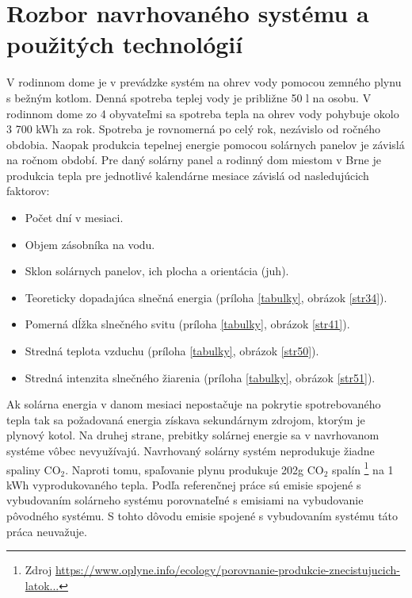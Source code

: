 \documentclass[a4paper, 11pt]{article}
\begin{document}
\section{Rozbor navrhovaného systému a použitých technológií}

V rodinnom dome je v prevádzke systém na ohrev vody pomocou zemného plynu s bežným kotlom. Denná spotreba teplej vody je približne 50 l na osobu. V rodinnom dome zo 4 obyvateľmi sa spotreba tepla na ohrev vody pohybuje okolo 3 700 kWh za rok. Spotreba je rovnomerná po celý rok, nezávislo od ročného obdobia. Naopak produkcia tepelnej energie pomocou solárnych panelov je závislá na ročnom období. Pre daný solárny panel a rodinný dom miestom v Brne je produkcia tepla pre jednotlivé kalendárne mesiace závislá od nasledujúcich faktorov:
\begin{itemize}
	\item Počet dní v mesiaci.
	\item Objem zásobníka na vodu.
	\item Sklon solárnych panelov, ich plocha a orientácia (juh).
	\item Teoreticky dopadajúca slnečná energia (príloha \ref{tabulky}, obrázok \ref{str34}).
	\item Pomerná dĺžka slnečného svitu (príloha \ref{tabulky}, obrázok \ref{str41}).
	\item Stredná teplota vzduchu (príloha \ref{tabulky}, obrázok \ref{str50}).
	\item Stredná intenzita slnečného žiarenia (príloha \ref{tabulky}, obrázok \ref{str51}).
\end{itemize}

Ak solárna energia v danom mesiaci nepostačuje na pokrytie spotrebovaného tepla tak sa požadovaná energia získava sekundárnym zdrojom, ktorým je plynový kotol. Na druhej strane, prebitky solárnej energie sa v navrhovanom systéme vôbec nevyužívajú. Navrhovaný solárny systém neprodukuje žiadne spaliny CO$_2$. Naproti tomu, spaľovanie plynu produkuje 202g CO$_2$ spalín \footnote{Zdroj \href{https://www.oplyne.info/ecology/porovnanie-produkcie-znecistujucich-latok-so2-tzl-nox-co-a-sklenikoveho-plynu-co2-vyprodukovanych-spalinami-v-rodinnom-dome-vykurovanie-drevom-ciernym-hnedym-uhlim-a-zemnym-plynom/}{https://www.oplyne.info/ecology/porovnanie-produkcie-znecistujucich-latok...}}  na 1 kWh vyprodukovaného tepla. Podľa referenčnej práce sú emisie spojené s vybudovaním solárneho systému porovnateľné s emisiami na vybudovanie pôvodného systému. S tohto dôvodu emisie spojené s vybudovaním systému táto práca neuvažuje. 
\end{document}
